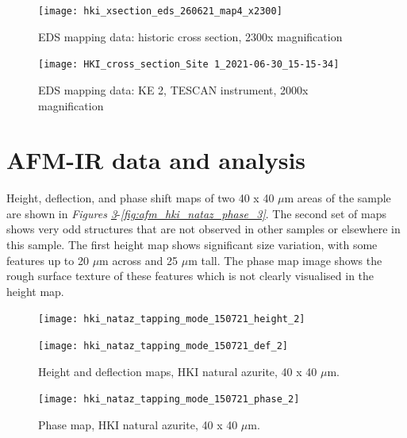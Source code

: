 \begin{figure}[H] %
\centering
  \texttt{[image: hki\_xsection\_eds\_260621\_map4\_x2300]}
\caption[EDS mapping data: historic cross section, 2300x magnification]{EDS mapping data: historic cross section, 2300x magnification}
\label{fig:xsection_map6}
\end{figure}

\begin{figure}[H] %
\centering
  \texttt{[image: HKI\_cross\_section\_Site 1\_2021-06-30\_15-15-34]}
\caption[EDS mapping data: KE 2, TESCAN instrument, 2000x magnification]{EDS mapping data: KE 2, TESCAN instrument, 2000x magnification}
\label{fig:xsection_map7}
\end{figure}


\section{AFM-IR data and analysis} 

Height, deflection, and phase shift maps of two 40 x 40 $\mu$m areas of the sample are shown in \textit{Figures \ref{fig:afm_hki_nataz_height_def_2}}-\textit{\ref{fig:afm_hki_nataz_phase_3}}. The second set of maps shows very odd structures that are not observed in other samples or elsewhere in this sample. The first height map shows significant size variation, with some features up to 20 $\mu$m across and 25 $\mu$m tall. The phase map image shows the rough surface texture of these features which is not clearly visualised in the height map. 

\begin{figure}[H]
\centering
\begin{minipage}{.45\textwidth}
  \centering
  \texttt{[image: hki\_nataz\_tapping\_mode\_150721\_height\_2]}
\end{minipage}
\begin{minipage}{.45\textwidth}
  \centering
  \texttt{[image: hki\_nataz\_tapping\_mode\_150721\_def\_2]}
\end{minipage}
\caption[Height and deflection maps, HKI natural azurite]{Height and deflection maps, HKI natural azurite, 40 x 40 $\mu$m.}
\label{fig:afm_hki_nataz_height_def_2}
\end{figure}

\begin{figure}[H]
\centering
  \texttt{[image: hki\_nataz\_tapping\_mode\_150721\_phase\_2]}
\caption[Phase map, HKI natural azurite]{Phase map, HKI natural azurite, 40 x 40 $\mu$m.}
\label{fig:afm_hki_nataz_phase_2}
\end{figure}

